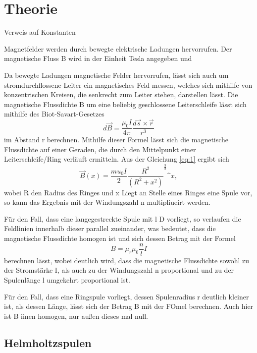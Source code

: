 \section{Theorie}
\label{sec:Theorie}

Verweis auf Konstanten

Magnetfelder werden durch bewegte elektrische Ladungen hervorrufen. Der magnetische Fluss B wird in der Einheit Tesla 
angegeben und 


Da bewegte Ladungen magnetische Felder hervorrufen, lässt sich auch um stromdurchflossene Leiter ein 
magnetisches Feld messen, welches sich mithilfe von konzentrischen Kreisen, die senkrecht zum Leiter 
stehen, darstellen lässt.
Die magnetische Flussdichte B um eine beliebig geschlossene Leiterschleife lässt sich mithilfe des Biot-Savart-Gesetzes
\begin{equation}
    d\vec B = \frac{\mu_0 I}{4 \pi} \frac{d\vec s \times \vec r}{r^3}
    \label{eq:2} 
\end{equation}
\noindent
im Abstand r berechnen. Mithilfe dieser Formel lässt sich die magnetische Flussdichte auf einer Geraden, die durch den 
Mittelpunkt einer Leiterschleife/Ring verläuft ermitteln. Aus der Gleichung \ref{eq:1} ergibt sich 
\begin{equation}
    \vec B (x) = \frac{mu_0 I}{2} \frac{R^2}{(R^2+x^2)}^\frac{3}{2} \^{x},
\end{equation}
\noindent
wobei R den Radius des Ringes und x 
Liegt an Stelle eines Ringes eine Spule vor, so kann das Ergebnis mit der Windungszahl n multipliueirt werden.



Für den Fall, dass eine langegestreckte Spule mit l \gg D vorliegt, so verlaufen die Feldlinien 
innerhalb dieser parallel zueinander, was bedeutet, dass die magnetische Flussdichte homogen 
ist und sich dessen Betrag mit der Formel
\begin{equation}
    B = \mu_r \mu_0 \frac{n}{l} I
\end{equation}
\noindent 
berechnen lässt, wobei deutlich wird, dass die magnetische Flussdichte sowohl zu der Stromstärke I, 
als auch zu der Windungszahl n proportional und zu der Spulenlänge l umgekehrt proportional ist.

Für den Fall, dass eine Ringspule vorliegt, dessen Spulenradius r deutlich kleiner ist, als dessen Länge, lässt sich
der Betrag B mit der FOmel berechnen. Auch hier ist B iinen homogen, nur außen dieses mal null.

\subsection{Helmholtzspulen}

